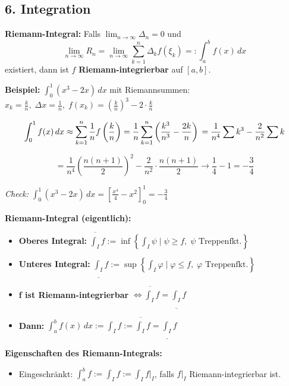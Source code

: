 \begin{itemize}
\subsection{6. Integration}

\textbf{Riemann-Integral:}  
Falls \( \lim_{n \to \infty} \Delta_n = 0 \) und  
\[
\lim_{n \to \infty} R_n = \lim_{n \to \infty} \sum_{k=1}^{n} \Delta_k f(\xi_k) =: \int_a^b f(x)\,dx
\]
existiert, dann ist \( f \) \textbf{Riemann-integrierbar} auf \( [a,b] \).

\textbf{Beispiel:} \( \displaystyle \int_0^1 (x^3 - 2x)\,dx \) mit Riemannsummen:  
\( x_k = \frac{k}{n},\; \Delta x = \frac{1}{n},\; f(x_k) = \left( \frac{k}{n} \right)^3 - 2 \cdot \frac{k}{n} \)

\[
\int_0^1 f(x)\,dx \approx \sum_{k=1}^n \frac{1}{n} f\left(\frac{k}{n}\right)
= \frac{1}{n} \sum_{k=1}^n \left( \frac{k^3}{n^3} - \frac{2k}{n} \right) \\
= \frac{1}{n^4} \sum k^3 - \frac{2}{n^2} \sum k
\]

\[
= \frac{1}{n^4} \left( \frac{n(n+1)}{2} \right)^2 - \frac{2}{n^2} \cdot \frac{n(n+1)}{2}
\to \frac{1}{4} - 1 = -\frac{3}{4}
\]

\textit{Check:}  
\( \int_0^1 (x^3 - 2x)\,dx = \left[ \frac{x^4}{4} - x^2 \right]_0^1 = -\frac{3}{4} \)

\textbf{Riemann-Integral (eigentlich):}
\begin{itemize}
  \item \textbf{Oberes Integral:} 
    \( \overline{\int_I} f := \inf \left\{ \int_I \psi \mid \psi \ge f,\; \psi \text{ Treppenfkt.} \right\} \)
  \item \textbf{Unteres Integral:} 
    \( \underline{\int_I} f := \sup \left\{ \int_I \varphi \mid \varphi \le f,\; \varphi \text{ Treppenfkt.} \right\} \)
  \item \textbf{f ist Riemann-integrierbar} \( \Leftrightarrow \overline{\int_I} f = \underline{\int_I} f \)
  \item \textbf{Dann:} \( \int_a^b f(x)\,dx := \int_I f := \overline{\int_I} f = \underline{\int_I} f \)
\end{itemize}

\textbf{Eigenschaften des Riemann-Integrals:}
\begin{itemize}
  \item Eingeschränkt: \( \int_a^b f := \int_I f := \int_I f|_I \), falls \( f|_I \) Riemann-integrierbar ist.


\end{itemize}
\end{itemize}
